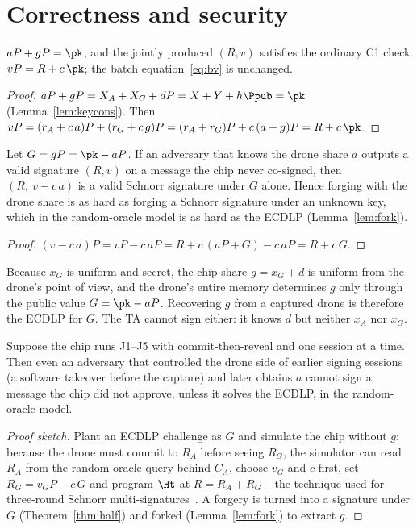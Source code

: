 \section{Correctness and security}
\begin{lemma}[Correctness]\label{lem:c4corr}
$aP+gP=\pk$, and the jointly produced $(R,v)$ satisfies the ordinary C1 check $vP=R+c\,\pk$; the batch equation~\eqref{eq:bv} is unchanged.
\end{lemma}
\begin{proof}
$aP+gP=X_A+X_G+dP=X+Y+h\Ppub=\pk$ (Lemma~\ref{lem:keycons}). Then
$vP=(r_A+c\,a)P+(r_G+c\,g)P=(r_A+r_G)P+c\,(a+g)P=R+c\,\pk$.
\end{proof}

\begin{theorem}\label{thm:half}
Let $G=gP=\pk-aP$. If an adversary that knows the drone share $a$ outputs a valid signature $(R,v)$ on a message the chip never co-signed, then
$(R,\ v-c\,a)$ is a valid Schnorr signature under $G$ alone. Hence forging with the drone share is as hard as forging a Schnorr signature under an unknown
key, which in the random-oracle model is as hard as the ECDLP (Lemma~\ref{lem:fork}).
\end{theorem}
\begin{proof}
$(v-c\,a)P=vP-c\,aP=R+c\,(aP+G)-c\,aP=R+c\,G$.
\end{proof}

\begin{theorem}\label{thm:indep}
Because $x_G$ is uniform and secret, the chip share $g=x_G+d$ is uniform from the drone's point of view, and the drone's entire memory determines $g$ only
through the public value $G=\pk-aP$. Recovering $g$ from a captured drone is therefore the ECDLP for $G$. The TA cannot sign either: it knows $d$ but
neither $x_A$ nor $x_G$.
\end{theorem}

\begin{theorem}\label{thm:capture}
Suppose the chip runs J1--J5 with commit-then-reveal and one session at a time. Then even an adversary that controlled the drone side of earlier signing
sessions (a software takeover before the capture) and later obtains $a$ cannot sign a message the chip did not approve, unless it solves the ECDLP, in the
random-oracle model.
\end{theorem}
\begin{proof}[Proof sketch]
Plant an ECDLP challenge as $G$ and simulate the chip without $g$: because the drone must commit to $R_A$ before seeing $R_G$, the simulator can read
$R_A$ from the random-oracle query behind $C_A$, choose $v_G$ and $c$ first, set $R_G=v_GP-c\,G$ and program $\Ht$ at $R=R_A+R_G$ -- the technique used
for three-round Schnorr multi-signatures~\cite{bnforking}. A forgery is turned into a signature under $G$ (Theorem~\ref{thm:half}) and forked
(Lemma~\ref{lem:fork}) to extract $g$.
\end{proof}

